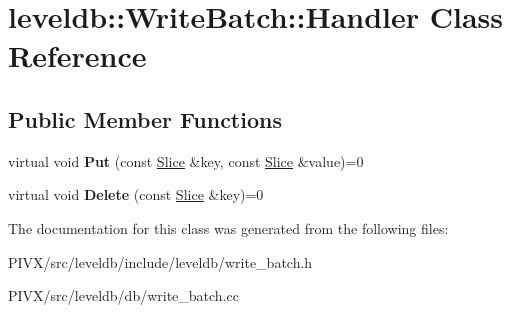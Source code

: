 \hypertarget{classleveldb_1_1_write_batch_1_1_handler}{}\section{leveldb\+:\+:Write\+Batch\+:\+:Handler Class Reference}
\label{classleveldb_1_1_write_batch_1_1_handler}
\subsection*{Public Member Functions}
\begin{DoxyCompactItemize}
\item 
\mbox{\label{classleveldb_1_1_write_batch_1_1_handler_ad41d4985db289b94e29921167d206d4b}} 
virtual void {\bfseries Put} (const \mbox{\hyperlink{classleveldb_1_1_slice}{Slice}} \&key, const \mbox{\hyperlink{classleveldb_1_1_slice}{Slice}} \&value)=0
\item 
\mbox{\label{classleveldb_1_1_write_batch_1_1_handler_aeab6526b87bf5b50fb64216b69b34b17}} 
virtual void {\bfseries Delete} (const \mbox{\hyperlink{classleveldb_1_1_slice}{Slice}} \&key)=0
\end{DoxyCompactItemize}


The documentation for this class was generated from the following files\+:\begin{DoxyCompactItemize}
\item 
P\+I\+V\+X/src/leveldb/include/leveldb/write\+\_\+batch.\+h\item 
P\+I\+V\+X/src/leveldb/db/write\+\_\+batch.\+cc\end{DoxyCompactItemize}
